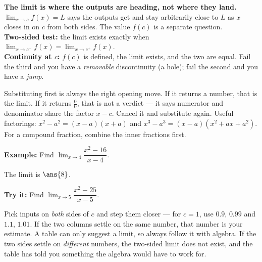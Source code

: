 \documentclass[12pt]{article}
\begin{document}

\begin{formulabox}
\textbf{The limit is where the outputs are heading, not where they land.}
$\lim_{x\to c}f(x)=L$ says the outputs get and stay arbitrarily close to $L$ as
$x$ closes in on $c$ from both sides. The value $f(c)$ is a separate
question.\\[3pt]
\textbf{Two-sided test:} the limit exists exactly when
$\lim_{x\to c^-}f(x)=\lim_{x\to c^+}f(x)$.\\[3pt]
\textbf{Continuity at $c$:} $f(c)$ is defined, the limit exists, and the two
are equal. Fail the third and you have a \emph{removable} discontinuity (a
hole); fail the second and you have a \emph{jump}.
\end{formulabox}


\begin{formulabox}
Substituting first is always the right opening move. If it returns a number,
that is the limit. If it returns $\tfrac00$, that is not a verdict --- it says
numerator and denominator share the factor $x-c$. Cancel it and substitute
again. Useful factorings: $x^2-a^2=(x-a)(x+a)$ and
$x^3-a^3=(x-a)(x^2+ax+a^2)$. For a compound fraction, combine the inner
fractions first.
\end{formulabox}

\begin{examplebox}
\textbf{Example:} Find $\lim_{x\to 4}\dfrac{x^2-16}{x-4}$.

The limit is $\ans{8}$.
\end{examplebox}

\begin{tryitbox}
\textbf{Try it:} Find $\lim_{x\to 5}\dfrac{x^2-25}{x-5}$.\\[2pt]
\end{tryitbox}


\begin{formulabox}
Pick inputs on \emph{both} sides of $c$ and step them closer --- for $c=1$,
use $0.9,\,0.99$ and $1.1,\,1.01$. If the two columns settle on the same
number, that number is your estimate. A table can only suggest a limit, so
always follow it with algebra. If the two sides settle on \emph{different}
numbers, the two-sided limit does not exist, and the table has told you
something the algebra would have to work for.
\end{formulabox}
\end{document}
